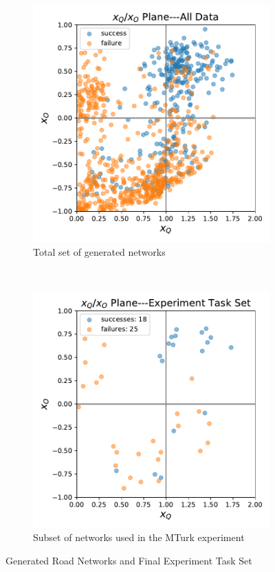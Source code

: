 \begin{figure}[tbp]
    \centering
    \begin{subfigure}[b]{0.80\linewidth}
        \centering
        \includegraphics[width=0.95\linewidth]{Figures/xQxO_Plane.pdf}
        \vfill
        \caption{Total set of generated networks}
        \label{fig:appendix_tot_set}
    \end{subfigure}%
    \\
    \begin{subfigure}[b]{0.80\linewidth}
        \centering
        \includegraphics[width=0.95\linewidth]{Figures/xQxO_plane_experiment_set.pdf}
        \caption{Subset of networks used in the MTurk experiment}
        \label{fig:appendix_exp_set}
    \end{subfigure} 
    \caption{Generated Road Networks and Final Experiment Task Set}
    \label{fig:appendix_exp_data}
    \vspace{-0.2cm}
\end{figure}

